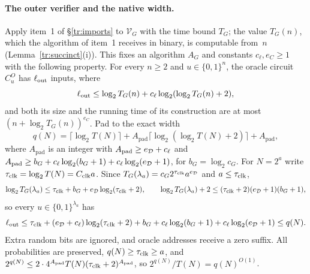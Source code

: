 \documentclass[11pt,letterpaper]{article}
\theoremstyle{definition}
\theoremstyle{remark}
\begin{document}
\paragraph{The outer verifier and the native width.}
Apply item~1 of \S\ref{tr:imports} to $\mathcal V_G$ with the time bound
$T_G$; the value $T_G(n)$, which the algorithm of item~1 receives in
binary, is computable from~$n$ (Lemma~\ref{tr:succinct}(i)). This fixes an algorithm $A_G$ and constants
$c_\ell,e_C\ge1$ with the following property. For every $n\ge2$ and
$u\in\{0,1\}^n$, the oracle circuit $C^O_u$ has $\ell_{\rm out}$ inputs,
where
\[
 \ell_{\rm out}\le\log_2T_G(n)+c_\ell\log_2(\log_2T_G(n)+2),
\]
and both its size and the running time of its construction are at most
$(n+\log_2T_G(n))^{e_C}$. Pad to the exact width
\begin{equation}
 q(N)=\lceil\log_2 T(N)\rceil+
 A_{\mathrm{pad}}\lceil\log_2(\log_2T(N)+2)\rceil+A_{\mathrm{pad}},
 \label{tr:native-width}
\end{equation}
where $A_{\mathrm{pad}}$ is an integer with
$A_{\rm pad}\ge e_{\mathcal D}+c_\ell$ and
$A_{\rm pad}\ge b_G+c_\ell\log_2(b_G+1)+c_\ell\log_2(e_{\mathcal D}+1)$,
for $b_G=\log_2c_G$. For $N=2^a$ write
$\tau_{\rm clk}=\log_2T(N)=C_{\rm clk}a$. Since
$T_G(\lambda_a)=c_G2^{\tau_{\rm clk}}a^{e_{\mathcal D}}$ and
$a\le\tau_{\rm clk}$,
\[
 \log_2T_G(\lambda_a)\le\tau_{\rm clk}+b_G
 +e_{\mathcal D}\log_2(\tau_{\rm clk}+2),
 \qquad
 \log_2T_G(\lambda_a)+2\le(\tau_{\rm clk}+2)(e_{\mathcal D}+1)(b_G+1),
\]
so every $u\in\{0,1\}^{\lambda_a}$ has
\[
 \ell_{\rm out}\le\tau_{\rm clk}+(e_{\mathcal D}+c_\ell)
 \log_2(\tau_{\rm clk}+2)+b_G+c_\ell\log_2(b_G+1)
 +c_\ell\log_2(e_{\mathcal D}+1)\le q(N).
\]
Extra random bits are ignored, and oracle addresses receive a zero
suffix. All probabilities are preserved, $q(N)\ge\tau_{\rm clk}\ge a$, and
$2^{q(N)}\le2\cdot4^{A_{\rm pad}}T(N)(\tau_{\rm clk}+2)^{A_{\rm pad}}$, so
$2^{q(N)}/T(N)=q(N)^{O(1)}$.
\end{document}
